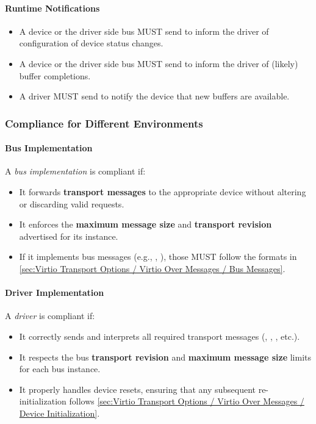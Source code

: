 \paragraph{Runtime Notifications}
\begin{itemize}
  \item A device or the driver side bus MUST send 
    to inform the driver of configuration of device status changes.
  \item A device or the driver side bus MUST send 
    to inform the driver of (likely) buffer completions.
  \item A driver MUST send  to notify the device that
    new buffers are available.
\end{itemize}

\subsubsection{Compliance for Different Environments}
\label{sec:Virtio Transport Options / Virtio Over Messages / Compliance / DifferentEnvs}

\paragraph{Bus Implementation}
A \emph{bus implementation} is compliant if:
\begin{itemize}
  \item It forwards \textbf{transport messages} to the appropriate device
    without altering or discarding valid requests.
  \item It enforces the \textbf{maximum message size} and \textbf{transport
    revision} advertised for its instance.
  \item If it implements bus messages (e.g., , ),
    those MUST follow the formats in
    \ref{sec:Virtio Transport Options / Virtio Over Messages / Bus Messages}.
\end{itemize}

\paragraph{Driver Implementation}
A \emph{driver} is compliant if:
\begin{itemize}
  \item It correctly sends and interprets all required transport messages
    (, , , etc.).
  \item It respects the bus \textbf{transport revision}  and \textbf{maximum
    message size} limits for each bus instance.
  \item It properly handles device resets, ensuring that any
    subsequent re-initialization follows
    \ref{sec:Virtio Transport Options / Virtio Over Messages / Device Initialization}.
\end{itemize}

